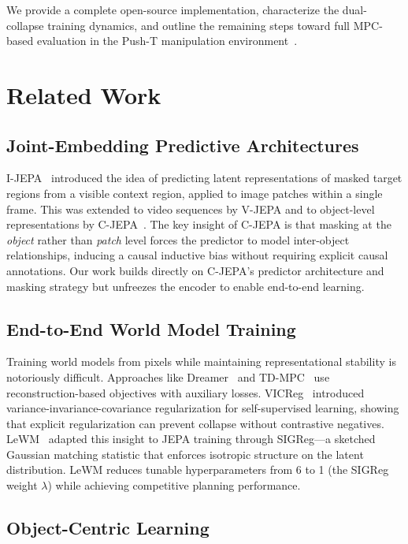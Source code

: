\documentclass[12pt]{article}
\begin{document}
We provide a complete open-source implementation, characterize the dual-collapse training dynamics, and outline the remaining steps toward full MPC-based evaluation in the Push-T manipulation environment~\citep{chi2023diffusion}.

\section{Related Work}

\subsection{Joint-Embedding Predictive Architectures}

I-JEPA~\citep{assran2023ijepa} introduced the idea of predicting latent representations of masked target regions from a visible context region, applied to image patches within a single frame. This was extended to video sequences by V-JEPA and to object-level representations by C-JEPA~\citep{nam2026cjepa}. The key insight of C-JEPA is that masking at the \emph{object} rather than \emph{patch} level forces the predictor to model inter-object relationships, inducing a causal inductive bias without requiring explicit causal annotations. Our work builds directly on C-JEPA's predictor architecture and masking strategy but unfreezes the encoder to enable end-to-end learning.

\subsection{End-to-End World Model Training}

Training world models from pixels while maintaining representational stability is notoriously difficult. Approaches like Dreamer~\citep{hafner2023dreamerv3} and TD-MPC~\citep{hansen2022tdmpc} use reconstruction-based objectives with auxiliary losses. VICReg~\citep{bardes2022vicreg} introduced variance-invariance-covariance regularization for self-supervised learning, showing that explicit regularization can prevent collapse without contrastive negatives. LeWM~\citep{maes2026lewm} adapted this insight to JEPA training through SIGReg---a sketched Gaussian matching statistic that enforces isotropic structure on the latent distribution. LeWM reduces tunable hyperparameters from 6 to 1 (the SIGReg weight $\lambda$) while achieving competitive planning performance.

\subsection{Object-Centric Learning}
\end{document}
